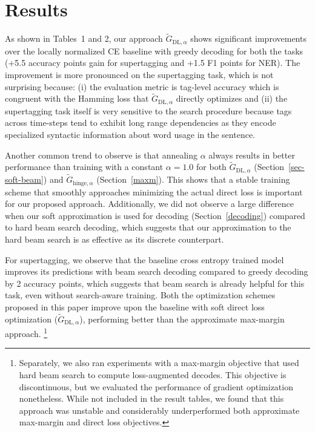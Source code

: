 \documentclass[letterpaper]{article} %
\begin{document}
\section{Results}
\label{results}
As shown in Tables~1 and 2, our approach $\tilde{G}_{\textrm{DL},\alpha}$ shows significant improvements over the locally normalized CE baseline with greedy decoding for both the tasks (+5.5 accuracy points gain for supertagging and +1.5 F1 points for NER). The improvement is more pronounced on the supertagging task, which is not surprising because: (i) the evaluation metric is tag-level accuracy which is congruent with the Hamming loss that $\tilde{G}_{\textrm{DL},\alpha}$ directly optimizes and (ii) the supertagging task itself is very sensitive to the search procedure because tags across time-steps tend to exhibit long range dependencies as they encode specialized syntactic information about word usage in the sentence. 

Another common trend to observe is that annealing $\alpha$ always results in better performance than training with a constant $\alpha=1.0$ for both $\tilde{G}_{\textrm{DL},\alpha}$ (Section~\ref{sec-soft-beam}) and $\tilde{G}_{\textrm{hinge},\alpha}$ (Section~\ref{maxm}). This shows that a stable training scheme that smoothly approaches minimizing the actual direct loss is important for our proposed approach. Additionally, we did not observe a large difference when our soft approximation is used for decoding (Section~\ref{decoding}) compared to hard beam search decoding, which suggests that our approximation to the hard beam search is as effective as its discrete counterpart.

For supertagging, we observe that the baseline cross entropy trained model improves its predictions with  beam search decoding compared to greedy decoding by 2 accuracy points, which suggests that beam search is already helpful for this task, even without search-aware training. Both the optimization schemes proposed in this paper improve upon the baseline with soft direct loss optimization ($\tilde{G}_{\textrm{DL},\alpha}$), performing better than the approximate max-margin approach. \footnote{Separately, we also ran experiments with a max-margin objective that used hard beam search to compute loss-augmented decodes. This objective is discontinuous, but we evaluated the performance of gradient optimization nonetheless. While not included in the result tables, we found that this approach was unstable and considerably underperformed both approximate max-margin %
and 
direct loss objectives.} 
\end{document}
